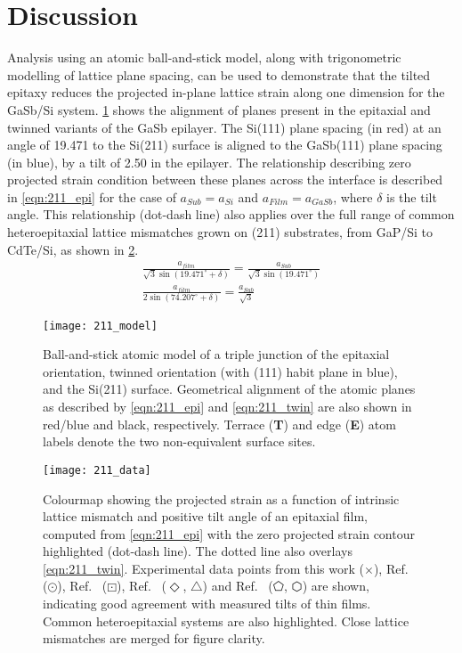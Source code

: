 \section{Discussion}
Analysis using an atomic ball-and-stick model, along with trigonometric modelling of lattice plane spacing, can be used to demonstrate that the tilted epitaxy reduces the projected in-plane lattice strain along one dimension for the GaSb/Si system.
\cref{fig:211_model} shows the alignment of planes present in the epitaxial and twinned variants of the GaSb epilayer.
The Si(111) plane spacing (in red) at an angle of 19.471\degree{} to the Si(211) surface is aligned to the GaSb(111) plane spacing (in blue), by a tilt of 2.50\degree{} in the epilayer.
The relationship describing zero projected strain condition between these planes across the interface is described in \cref{eqn:211_epi} for the case of \(a_{Sub} = a_{Si}\) and \(a_{Film} = a_{GaSb}\), where \(\delta\) is the tilt angle.
This relationship (dot-dash line) also applies over the full range of common heteroepitaxial lattice mismatches grown on (211) substrates, from GaP/Si to CdTe/Si, as shown in \cref{fig:211_data}.
\begin{gather}
 \frac{a_{film}}{\sqrt{3} \sin(19.471^\circ + \delta)} = \frac{a_{Sub}}{\sqrt{3}\sin(19.471^\circ)} \label{eqn:211_epi}\\
 \frac{ a_{film}}{2\sin(74.207^\circ + \delta)} = \frac{a_{Sub}}{\sqrt{3}} \label{eqn:211_twin}
\end{gather}

\begin{figure}
 \centering \texttt{[image: 211\_model]}
 \caption[Atomic model of tilted thin film on 211 silicon]{\label{fig:211_model}Ball-and-stick atomic model of a triple junction of the epitaxial orientation, twinned orientation (with (111) habit plane in blue), and the Si(211) surface.
  Geometrical alignment of the atomic planes as described by \cref{eqn:211_epi} and \cref{eqn:211_twin} are also shown in red/blue and black, respectively.
  Terrace (\textbf{T}) and edge (\textbf{E}) atom labels denote the two non-equivalent surface sites.}
\end{figure}

\begin{figure}
 \centering \texttt{[image: 211\_data]}
 \caption[Colourmap of tilt and intrinsic lattice mismatch of thin films on 211 substrates]{\label{fig:211_data}Colourmap showing the projected strain as a function of intrinsic lattice mismatch and positive tilt angle of an epitaxial film, computed from \cref{eqn:211_epi} with the zero projected strain contour highlighted (dot-dash line).
  The dotted line also overlays \cref{eqn:211_twin}.
  Experimental data points from this work (\(\times\)), Ref.~ (\(\odot\)), Ref.~ (\(\boxdot\)), Ref.~ (\(\Diamond\), \(\bigtriangleup\)) and Ref.~ (\(\pentagon\), \(\varhexagon\)) are shown, indicating good agreement with measured tilts of thin films.
  Common heteroepitaxial systems are also highlighted.
  Close lattice mismatches are merged for figure clarity.}
\end{figure}

